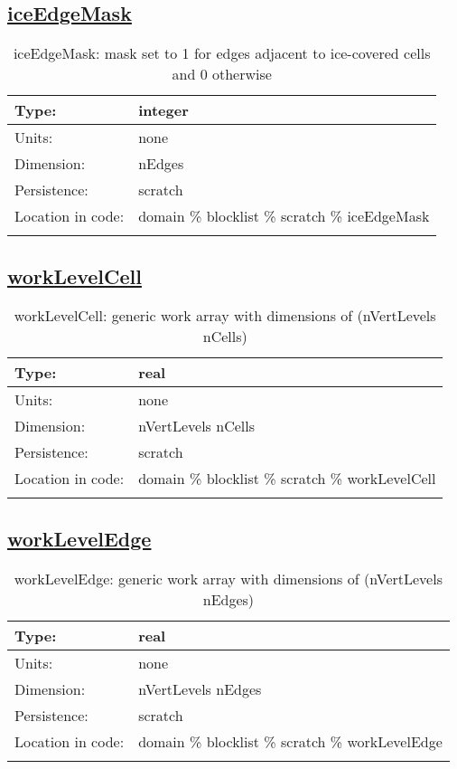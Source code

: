 \subsection[iceEdgeMask]{\hyperref[sec:var_tab_scratch]{iceEdgeMask}}
\label{subsec:var_sec_scratch_iceEdgeMask}
\begin{center}
\begin{longtable}{| p{2.0in} | p{4.0in} |}
        \hline 
        Type: & integer \\
        \hline 
        Units: & \si{none} \\
        \hline 
        Dimension: & nEdges \\
        \hline 
        Persistence: & scratch \\
        \hline 
         Location in code: & domain \% blocklist \% scratch \% iceEdgeMask \\
         \hline 
    \caption{iceEdgeMask: mask set to 1 for edges adjacent to ice-covered cells and 0 otherwise}
\end{longtable}
\end{center}
\subsection[workLevelCell]{\hyperref[sec:var_tab_scratch]{workLevelCell}}
\label{subsec:var_sec_scratch_workLevelCell}
\begin{center}
\begin{longtable}{| p{2.0in} | p{4.0in} |}
        \hline 
        Type: & real \\
        \hline 
        Units: & \si{none} \\
        \hline 
        Dimension: & nVertLevels nCells \\
        \hline 
        Persistence: & scratch \\
        \hline 
         Location in code: & domain \% blocklist \% scratch \% workLevelCell \\
         \hline 
    \caption{workLevelCell: generic work array with dimensions of (nVertLevels nCells)}
\end{longtable}
\end{center}
\subsection[workLevelEdge]{\hyperref[sec:var_tab_scratch]{workLevelEdge}}
\label{subsec:var_sec_scratch_workLevelEdge}
\begin{center}
\begin{longtable}{| p{2.0in} | p{4.0in} |}
        \hline 
        Type: & real \\
        \hline 
        Units: & \si{none} \\
        \hline 
        Dimension: & nVertLevels nEdges \\
        \hline 
        Persistence: & scratch \\
        \hline 
         Location in code: & domain \% blocklist \% scratch \% workLevelEdge \\
         \hline 
    \caption{workLevelEdge: generic work array with dimensions of (nVertLevels nEdges)}
\end{longtable}
\end{center}
